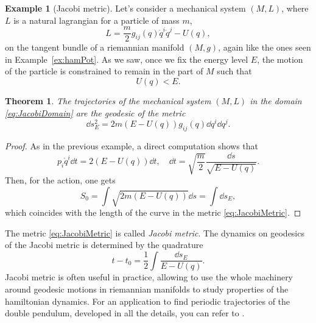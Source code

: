 \documentclass[english,fontsize=11pt,paper=b5]{scrbook}
\numberwithin{equation}{chapter}
\newtheorem{theorem}{Theorem}[chapter]
\theoremstyle{definition}
\newtheorem{example}{Example}[chapter]
\begin{document}
    \begin{example}[Jacobi metric]
      Let's consider a mechanical system $(M,L)$, where $L$ is a natural lagrangian for a particle of mass $m$,
      \begin{equation}
        L = \frac m2 g_{ij}(q) \dot q^i \dot q^j - U(q),
      \end{equation}
      on the tangent bundle of a riemannian manifold $(M,g)$, again like the ones seen in Example~\ref{ex:hamPot}.
      As we saw, once we fix the energy level $E$, the motion of the particle is constrained to remain in the part of $M$ such that
      \begin{equation}\label{eq:JacobiDomain}
        U(q) < E.
      \end{equation}

      \begin{theorem}
        The trajectories of the mechanical system $(M,L)$ in the domain \eqref{eq:JacobiDomain} are the geodesic of the metric
        \begin{equation}\label{eq:JacobiMetric}
          \dd s^2_E = 2m (E-U(q)) g_{ij}(q)\dd q^i \dd q^j.
        \end{equation}
      \end{theorem}
      \begin{proof}
        As in the previous example, a direct computation shows that
        \begin{equation}
          p_i \dot q^i \dd t = 2 (E-U(q)) \dd t, \quad
          \dd t = \sqrt{\frac{m}{2}} \frac{\dd s}{\sqrt{E-U(q)}}.
        \end{equation}
        Then, for the action, one gets
        \begin{equation}
          S_0 = \int \sqrt{2m(E-U(q))}\dd s = \int \dd s_E,
        \end{equation}
        which coincides with the length of the curve in the metric \eqref{eq:JacobiMetric}.
      \end{proof}

      The metric \eqref{eq:JacobiMetric} is called \emph{Jacobi metric}.
      The dynamics on geodesics of the Jacobi metric is determined by the quadrature
      \begin{equation}
        t - t_0 = \frac12 \int \frac{\dd s_E}{E-U(q)}.
      \end{equation}
      Jacobi metric is often useful in practice, allowing to use the whole machinery around geodesic motions in riemannian manifolds to study properties of the hamiltonian dynamics.
      For an application to find periodic trajectories of the double pendulum, developed in all the details, you can refer to \cite[Example 8.32]{book:knauf}.
    \end{example}
\end{document}
